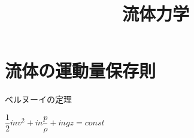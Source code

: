 \documentclass[a4paper]{jsarticle}
\author{}
\title{流体力学}
\date{}
\begin{document}
\maketitle

\section{流体の運動量保存則}
\begin{itembox}[l]{ベルヌーイの定理}
	\begin{center}
		$\dfrac{1}{2}\dot{m}v^2+\dot{m}\dfrac{p}{\rho}+\dot{m}gz=const$
	\end{center}
\end{itembox}
\end{document}
